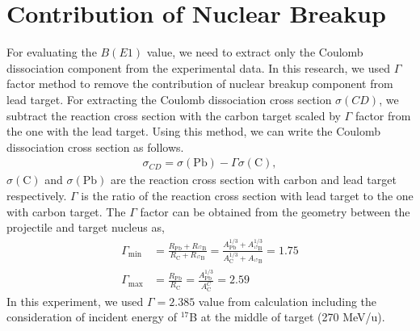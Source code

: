 \section{Contribution of Nuclear Breakup}
For evaluating the $B(E1)$ value, we need to extract only the Coulomb dissociation component from the experimental data. In this research, we used $\Gamma$ factor method to remove the contribution of nuclear breakup component from lead target. For extracting the Coulomb dissociation cross section $\sigma(CD)$, we subtract the reaction cross section with the carbon target scaled by $\Gamma$ factor from the one with the lead target. Using this method, we can write the Coulomb dissociation cross section as follows.
\begin{align}
    \sigma_{CD} = \sigma(\text{Pb}) - \Gamma \sigma(\text{C}),
\end{align}
$\sigma(\text{C})$ and $\sigma(\text{Pb})$ are the reaction cross section with carbon and lead target respectively. $\Gamma$ is the ratio of the reaction cross section with lead target to the one with carbon target. The $\Gamma$ factor can be obtained from the geometry between the projectile and target nucleus as,
\begin{align}
    \Gamma_{\text{min}} &= \frac{R_{\text{Pb}} + R_{{}^{17}\text{B}}}{R_{\text{C}} + R_{{}^{17}\text{B}}} = \frac{A_{\text{Pb}}^{1/3} + A_{^{17}\text{B}}^{1/3}}{A_{\text{C}}^{1/3} + A_{^{17}\text{B}}} = 1.75\\
    \Gamma_{\text{max}} &= \frac{R_{\text{Pb}}}{R_{\text{C}}} = \frac{A_{\text{Pb}}^{1/3}}{A_{\text{C}}^{C}} = 2.59
\end{align}
In this experiment, we used $\Gamma = 2.385$ value from calculation including the consideration of incident energy of $^{17}$B at the middle of target (270 MeV/u)\cite{Ogata}.

